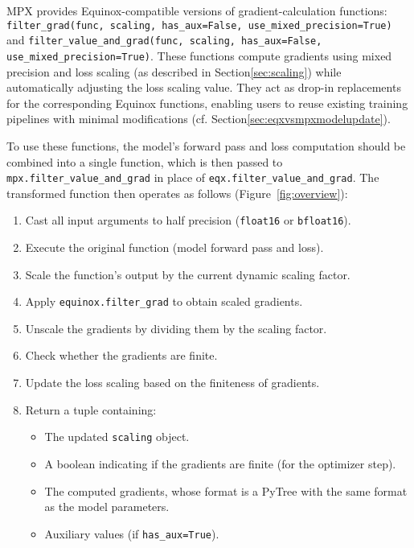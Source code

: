 \documentclass[10pt, a4paper, logo, onecolumn, internal, copyright]{dsme}
\newcommand{\mpx}{\textsc{MPX}}
\begin{document}
\mpx{} provides Equinox-compatible versions of gradient-calculation functions: \texttt{filter\_grad(func, scaling, has\_aux=False, use\_mixed\_precision=True)} and \texttt{filter\_value\_and\_grad(func, scaling, has\_aux=False, use\_mixed\_precision=True)}. 
These functions compute gradients using mixed precision and loss scaling (as described in Section\ref{sec:scaling}) while automatically adjusting the loss scaling value. 
They act as drop-in replacements for the corresponding Equinox functions, enabling users to reuse existing training pipelines with minimal modifications (cf. Section\ref{sec:eqxvsmpxmodelupdate}).

To use these functions, the model's forward pass and loss computation should be combined into a single function, which is then passed to \texttt{mpx.filter\_value\_and\_grad} in place of \texttt{eqx.filter\_value\_and\_grad}. 
The transformed function then operates as follows (Figure~\ref{fig:overview}):

\begin{enumerate}
    \item Cast all input arguments to half precision (\texttt{float16} or \texttt{bfloat16}).
    \item Execute the original function (model forward pass and loss).
    \item Scale the function's output by the current dynamic scaling factor.
    \item Apply \texttt{equinox.filter\_grad} to obtain scaled gradients.
    \item Unscale the gradients by dividing them by the scaling factor.
    \item Check whether the gradients are finite.
    \item Update the loss scaling based on the finiteness of gradients.
    \item Return a tuple containing:
    \begin{itemize}
        \item The updated \texttt{scaling} object.
        \item A boolean indicating if the gradients are finite (for the optimizer step).
        \item The computed gradients, whose format is a PyTree with the same format as the model parameters.
        \item Auxiliary values (if \texttt{has\_aux=True}).
    \end{itemize}
\end{enumerate}
\end{document}
